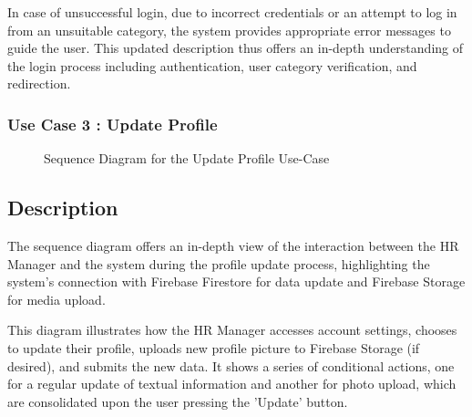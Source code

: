 In case of unsuccessful login, due to incorrect credentials or an attempt to log in from an unsuitable category, the system provides appropriate error messages to guide the user. This updated description thus offers an in-depth understanding of the login process including authentication, user category verification, and redirection.

\subsubsection{Use Case 3 : Update Profile} 
\begin{figure}[H]
    \centering
    \caption{ Sequence Diagram for the Update Profile Use-Case }
    \label{fig:UseCase3_Sequence_Diagram}
\end{figure}

\subsection*{Description}
The sequence diagram offers an in-depth view of the interaction between the HR Manager and the system during the profile update process, highlighting the system's connection with Firebase Firestore for data update and Firebase Storage for media upload.

This diagram illustrates how the HR Manager accesses account settings, chooses to update their profile, uploads new profile picture to Firebase Storage (if desired), and submits the new data. It shows a series of conditional actions, one for a regular update of textual information and another for photo upload, which are consolidated upon the user pressing the 'Update' button.

